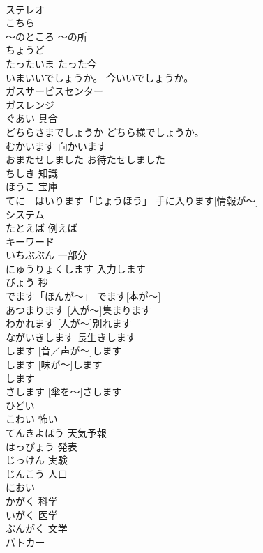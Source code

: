 \documentclass[8pt]{extreport}
\begin{document}
\begin{CJK}{UTF8}{min}
\\	ステレオ			
\\	こちら			
\\	～のところ	～の所	
\\	ちょうど			
\\	たったいま	たった今	
\\	いまいいでしょうか。	今いいでしょうか。	
\\	ガスサービスセンター			
\\	ガスレンジ			
\\	ぐあい	具合	
\\	どちらさまでしょうか	どちら様でしょうか。	
\\	むかいます	向かいます	
\\	おまたせしました	お待たせしました	
\\	ちしき	知識	
\\	ほうこ	宝庫	
\\	てに　はいります「じょうほう」	手に入ります[情報が～]	
\\	システム			
\\	たとえば	例えば	
\\	キーワード			
\\	いちぶぶん	一部分	
\\	にゅうりょくします	入力します	
\\	びょう	秒	
\\	でます「ほんが～」	でます[本が～]	
\\	[ひとが～] あつまります	[人が～]集まります	
\\	[ひとが～]わかれます	[人が～]別れます	
\\	ながいきします	長生きします	
\\	[おと／こえが～]します	[音／声が～]します	
\\	[あじが～] します	[味が～]します	
\\	[においが～] します			
\\	[かさを～] さします	[傘を～]さします	
\\	ひどい			
\\	こわい	怖い	
\\	てんきよほう	天気予報	
\\	はっぴょう	発表	
\\	じっけん	実験	
\\	じんこう	人口	
\\	におい			
\\	かがく	科学	
\\	いがく	医学	
\\	ぶんがく	文学	
\\	パトカー			

\end{CJK}
\end{document}
